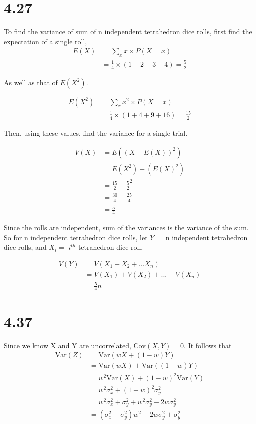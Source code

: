 \documentclass{article}
\begin{document}
\section*{4.27}
To find the variance of sum of n independent tetrahedron dice rolls, first find the expectation of a single roll,
\begin{align*}
E(X)&= \sum_{x} {x \times P(X = x)} \\
    &= \frac{1}{4} \times (1 + 2 + 3 + 4) = \frac{5}{2}
\end{align*}

\noindent
As well as that of $E(X^{2})$.

\begin{align*}
E(X^{2})&= \sum_{x} {x^{2} \times P(X = x)} \\
    &= \frac{1}{4} \times (1 + 4 + 9 + 16) = \frac{15}{2}
\end{align*}

\noindent
Then, using these values, find the variance for a single trial.

\begin{align*}
V(X)&= E((X-E(X))^{2}) \\
    &= E(X^{2}) - (E(X)^{2}) \\
    &= \frac{15}{2} - \frac{5}{2}^{2} \\
    &= \frac{30}{4} - \frac{25}{4} \\
    &= \frac{5}{4}
\end{align*}

\noindent
Since the rolls are independent, sum of the variances is the variance of the sum. So for n independent tetrahedron dice rolls, let $Y=$ n independent tetrahedron dice rolls, and $X_i=$ $i^{th}$ tetrahedron dice roll,

\begin{align*}
V(Y)&= V(X_1+X_2+...X_n) \\
    &= V(X_1)+V(X_2)+...+V(X_n) \\
    &= \frac{5}{4}n
\end{align*}

\section*{4.37}
Since we know X and Y are uncorrelated, $\text{Cov}(X, Y) = 0$. It follows that  
\begin{align*}
\text{Var}(Z)&= \text{Var}(wX + (1-w)Y) \\
    &= \text{Var}(wX) + \text{Var}((1-w)Y) \\
    &= w^{2}\text{Var}(X) + (1-w)^{2}\text{Var}(Y) \\
    &= w^{2}\sigma^{2}_{x} + (1-w)^{2}\sigma^{2}_{y} \\
    &= w^{2}\sigma^{2}_{x} + \sigma^{2}_{y} + w^{2}\sigma^{2}_{y} - 2w\sigma^{2}_{y}\\
    &= (\sigma^{2}_{x} + \sigma^{2}_{y})w^{2} - 2w\sigma^{2}_{y}+\sigma^{2}_{y}
\end{align*}
\end{document}
